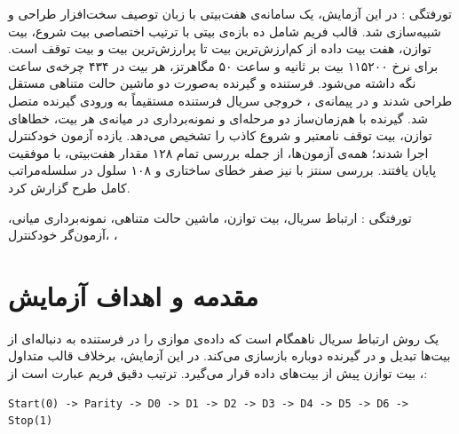 \newsavebox{\dsdlcodebox}
\newenvironment{dsdlcodeblock}
{%
  \par\noindent
  \begin{latin}
  \begin{lrbox}{\dsdlcodebox}
  \begin{minipage}{1.1\linewidth}
  \small
}
{%
  \end{minipage}
  \end{lrbox}
  \setlength{\fboxsep}{6pt}
  \fcolorbox{dsdlcodeborder}{dsdlcodebg}{\usebox{\dsdlcodebox}}
  \end{latin}
  \par
}


‌تورفتگی : در این آزمایش، یک سامانه‌ی  هفت‌بیتی با زبان توصیف سخت‌افزار
 طراحی و شبیه‌سازی شد. قالب فریم شامل ده بازه‌ی بیتی با ترتیب اختصاصی بیت شروع،
بیت توازن، هفت بیت داده از کم‌ارزش‌ترین بیت تا پرارزش‌ترین بیت و بیت توقف است. برای نرخ
۱۱۵۲۰۰ بیت بر ثانیه و ساعت ۵۰ مگاهرتز، هر بیت در ۴۳۴ چرخه‌ی ساعت نگه داشته می‌شود.
فرستنده و گیرنده به‌صورت دو ماشین حالت متناهی مستقل طراحی شدند و در پیمانه‌ی
، خروجی سریال فرستنده مستقیماً به ورودی گیرنده متصل شد. گیرنده با
هم‌زمان‌ساز دو مرحله‌ای و نمونه‌برداری در میانه‌ی هر بیت، خطاهای توازن، بیت توقف نامعتبر و
شروع کاذب را تشخیص می‌دهد. یازده آزمون خودکنترل اجرا شدند؛ همه‌ی آزمون‌ها، از جمله بررسی
تمام ۱۲۸ مقدار هفت‌بیتی، با موفقیت پایان یافتند. بررسی سنتز با  نیز صفر خطای
ساختاری و ۱۰۸ سلول در سلسله‌مراتب کامل طرح گزارش کرد.

‌تورفتگی :
ارتباط سریال، بیت توازن، ماشین حالت متناهی، نمونه‌برداری میانی، آزمون‌گر خودکنترل،
، 

\section{مقدمه و اهداف آزمایش}

 یک روش ارتباط سریال
ناهمگام است که داده‌ی موازی را در فرستنده به دنباله‌ای از بیت‌ها تبدیل و در گیرنده دوباره
بازسازی می‌کند. در این آزمایش، برخلاف قالب متداول ، بیت توازن پیش از بیت‌های داده
قرار می‌گیرد. ترتیب دقیق فریم عبارت است از:

\begin{dsdlcodeblock}
\begin{verbatim}
Start(0) -> Parity -> D0 -> D1 -> D2 -> D3 -> D4 -> D5 -> D6 -> Stop(1)
\end{verbatim}
\end{dsdlcodeblock}

